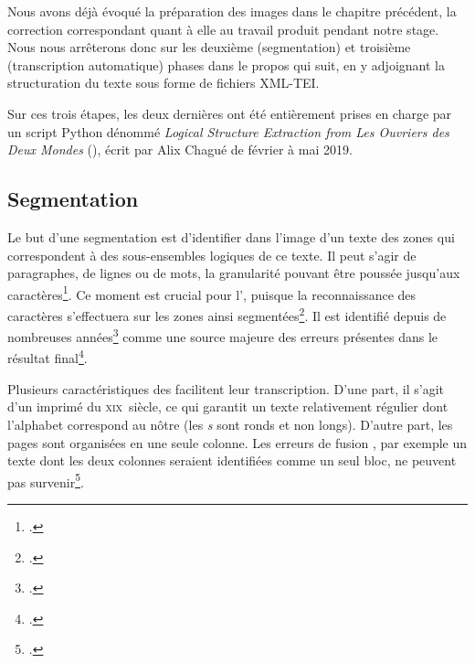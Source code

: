 Nous avons déjà évoqué la préparation des images dans le chapitre précédent, la correction correspondant quant à elle au travail produit pendant notre stage. Nous nous arrêterons donc sur les deuxième (segmentation) et troisième (transcription automatique) phases dans le propos qui suit, en y adjoignant la structuration du texte sous forme de fichiers XML-TEI.

Sur ces trois étapes, les deux dernières ont été entièrement prises en charge par un script Python dénommé \textit{Logical Structure Extraction from Les Ouvriers des Deux Mondes} (\lse), écrit par Alix Chagué de février à mai 2019.

\subsection{Segmentation}

Le but d'une segmentation est d'identifier dans l'image d'un texte des zones qui correspondent à des sous-ensembles logiques de ce texte. Il peut s'agir de paragraphes, de lignes ou de mots, la granularité pouvant être poussée jusqu'aux caractères\footcite[p. 3]{karpinski}. Ce moment est crucial pour l'\ocr, puisque la reconnaissance des caractères s'effectuera sur les zones ainsi segmentées\footcite[p. 3]{casey}. Il est identifié depuis de nombreuses années\footcite[p. 4]{casey} comme une source majeure des erreurs présentes dans le résultat final\footcite[p. 120]{elagouni}.

Plusieurs caractéristiques des \odm{} facilitent leur transcription. D'une part, il s'agit d'un imprimé du \textsc{xix}\ieme ~siècle, ce qui garantit un texte relativement régulier dont l'alphabet correspond au nôtre (les \textit{s} sont ronds et non longs). D'autre part, les pages sont organisées en une seule colonne. Les erreurs \og de fusion \fg{}, par exemple un texte dont les deux colonnes seraient identifiées comme un seul bloc, ne peuvent pas survenir\footcite[p. 5]{karpinski}.

